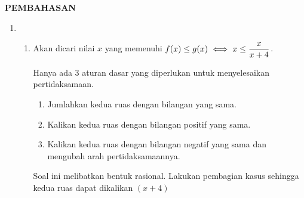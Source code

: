 \begin{center}
    \textbf{\large{PEMBAHASAN}}
\end{center}
\begin{enumerate}[leftmargin=*, label={\arabic*}.]
\item
\begin{enumerate}[label={\alph*}.]
\item Akan dicari nilai $x$ yang memenuhi
$\displaystyle f(x) \leq g(x) \iff x \leq \frac{x}{x+4}$.

\vspace{0.1cm}
Hanya ada 3 aturan dasar yang diperlukan untuk menyelesaikan pertidaksamaan.
\begin{enumerate}[label={\arabic*})]
    \item Jumlahkan kedua ruas dengan bilangan yang sama.
    \item Kalikan kedua ruas dengan bilangan positif yang sama.
    \item Kalikan kedua ruas dengan bilangan negatif yang sama dan 
    mengubah arah pertidaksamaannya.
\end{enumerate}
Soal ini melibatkan bentuk rasional. Lakukan pembagian kasus sehingga kedua
ruas dapat dikalikan $(x+4)$
    

\end{enumerate}
\end{enumerate}
